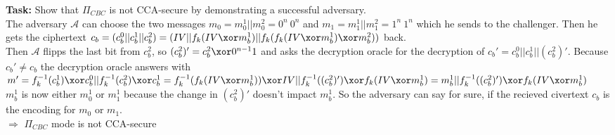 \textbf{Task:} Show that \(\Pi_{CBC}\) is not CCA-secure by demonstrating a successful adversary.  \\
The adversary  \(\mathcal{A}\) can choose the two messages \(m_{0}  = m_0^1 \vert \vert m_0^2 = 0^n\ 0^n\) and  \(m_{1}  = m_1^1 \vert \vert m_1^2 = 1^n\ 1^n\) which he sends to the challenger. Then he gets the ciphertext \(c_b = (c_b^0 \vert \vert c_b^1 \vert \vert c_b^2) = (IV \vert \vert f_k(IV \xor m_b^1) \vert \vert  f_k( f_k(IV \xor m_b^1) \xor m_b^2))\) back.\\
Then \(\mathcal{A}\) flipps the last bit from \(c_b^2\), so \((c_b^2)' = c_b^2 \xor 0^{n-1}1\) and asks the decryption oracle for the decryption of \(c_b' = c_b^0 \vert \vert c_b^1 \vert \vert (c_b^2)'\). Because \(c_b' \neq c_b\) the decryption oracle answers with \(m' = f_k^{-1}(c_b^1) \xor c_b^0 \vert \vert f_k^{-1}(c_b^2) \xor c_b^1  = f_k^{-1}(f_k(IV \xor m_b^1)) \xor IV \vert \vert f_k^{-1}((c_b^2)') \xor f_k(IV \xor m_b^1) = m_b^1 \vert \vert f_k^{-1}((c_b^2)') \xor f_k(IV \xor m_b^1)\) \\ 
\(m_b^1\) is now either \(m_0^1\) or \(m_1^1\) because the change in \((c_b^2)'\) doesn't impact \(m_b^1\). So the adversary can say for sure, if the recieved civertext \(c_b\) is the encoding for \(m_0\) or \(m_1\). \\
\(\Rightarrow\) \(\Pi_{CBC}\) mode is not CCA-secure \\
  